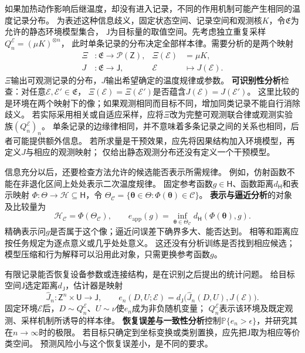 如果加热动作影响后继温度，却没有进入记录，不同的作用机制可能产生相同的温度记录分布。
为表述这种信息歧义，固定状态空间、记录空间和观测核$K$，令$\mathfrak E$为允许的静态环境模型集合，
$\mathsf J$为目标量的取值空间。先考虑独立重复采样$Q_n^{\mathcal E}=(\mu K)^{\otimes n}$，
此时单条记录的分布决定全部样本律。需要分析的是两个映射
\begin{equation}
  \begin{aligned}
    \Xi&:\mathfrak E\to\mathcal P(\mathsf Z),
      &\Xi(\mathcal E)&=\mu K,\\
    J&:\mathfrak E\to\mathsf J,
      &\mathcal E&\mapsto J(\mathcal E).
  \end{aligned}
  \label{eq:future-task-observation-target-maps}
\end{equation}
$\Xi$输出可观测记录的分布，$J$输出希望确定的温度规律或参数。
\textbf{可识别性分析}检查：对任意$\mathcal E,\mathcal E'\in\mathfrak E$，
$\Xi(\mathcal E)=\Xi(\mathcal E')$是否蕴含$J(\mathcal E)=J(\mathcal E')$。
这里比较的是环境在两个映射下的像；如果观测相同而目标不同，增加同类记录不能自行消除歧义。
若实际采用相关或自适应采样，应将$\Xi$改为完整可观测联合律或观测实验族$(Q_n^{\mathcal E})_n$。
单条记录的边缘律相同，并不意味着多条记录之间的关系也相同，后者可能提供额外信息。
若所求量是干预效果，应先将因果结构加入环境模型，再定义$J$与相应的观测映射；
仅给出静态观测分布还没有定义一个干预模型。

信息充分以后，还要检查方法允许的候选能否表示所需规律。
例如，仿射函数不能在非退化区间上处处表示二次温度规律。
固定参考函数$g\in\mathsf H$、函数距离$d_{\mathsf H}$和表示映射
$\Phi:\Theta\to\mathcal H\subseteq\mathsf H$，令
$\Theta_{\mathcal C}=\{\bm\theta\in\Theta:\Phi(\bm\theta)\in\mathcal C\}$。
\textbf{表示与逼近分析}的对象及比较量为
\[
  \mathcal H_{\mathcal C}=\Phi(\Theta_{\mathcal C}),\qquad
  e_{\mathrm{app}}(g)=
  \inf_{\bm\theta\in\Theta_{\mathcal C}}
       d_{\mathsf H}(\Phi(\bm\theta),g).
\]
精确表示问$g$是否属于这个像；逼近问误差下确界多大、能否达到。
相等和距离应按任务规定为逐点意义或几乎处处意义。
这还没有分析训练是否找到相应候选；模型压缩和行为解释可以沿用此对象，只需更换参考函数$g$。

有限记录能否恢复设备参数或连接结构，是在识别之后提出的统计问题。
给目标空间$\mathsf J$选定距离$d_{\mathsf J}$，估计器是映射
\[
  \widehat J_n:\mathsf Z^n\times\mathsf U\to\mathsf J,
  \qquad
  e_n(D,U;\mathcal E)=
  d_{\mathsf J}\bigl(\widehat J_n(D,U),J(\mathcal E)\bigr).
\]
固定环境$\mathcal E$后，$D\sim Q_n^{\mathcal E}$、$U\sim\nu$使$e_n$成为非负随机变量；
$Q_n^{\mathcal E}$表示该环境及既定观测、采样机制所诱导的样本律。
\textbf{恢复误差与一致性分析}控制$\mathbb P\{e_n>\epsilon\}$，并研究其在$n\to\infty$时的极限。
若目标只确定到坐标变换或类别置换，应先把$\mathsf J$取为相应等价类空间。
预测风险小与这个恢复误差小，是不同的要求。

